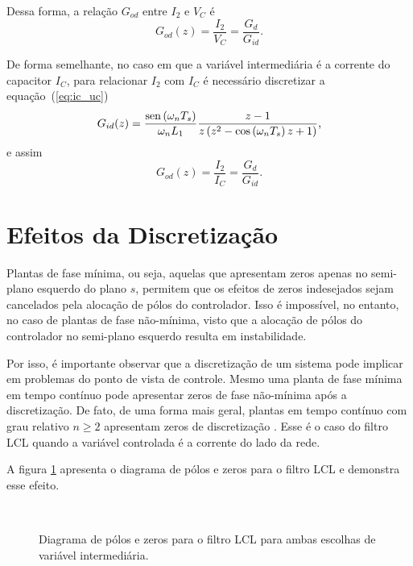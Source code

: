     Dessa forma, a relação $G_{od}$ entre $I_2$ e $V_C$ é
    \begin{equation}
        G_{od}(z) = \frac{I_2}{V_C} = \frac{G_d}{G_{id}} \text{.}
        \label{eq:god_i2_vc}
    \end{equation}

    De forma semelhante, no caso em que a variável intermediária é a corrente do capacitor $I_C$, para relacionar $I_2$ com $I_C$ é necessário discretizar a equação~(\ref{eq:ic_uc})
    \begin{equation}
        G_{id}(z) = \frac{\operatorname{sen} \left( \omega_n T_s \right)}{\omega_n L_1}
            \frac{z-1}{z \left( z^2 - \cos \left( \omega_n T_s \right) z + 1 \right)}
            \text{,}
    \end{equation}
    e assim
    \begin{equation}
        G_{od}(z) = \frac{I_2}{I_C} = \frac{G_d}{G_{id}} \text{.}
        \label{eq:god_i2_ic}
    \end{equation}


\section{Efeitos da Discretização}

    Plantas de fase mínima, ou seja, aquelas que apresentam zeros apenas no semi-plano esquerdo do plano $s$, permitem que os efeitos de zeros indesejados sejam cancelados pela alocação de pólos do controlador. Isso é impossível, no entanto, no caso de plantas de fase não-mínima, visto que a alocação de pólos do controlador no semi-plano esquerdo resulta em instabilidade.

    Por isso, é importante observar que a discretização de um sistema pode implicar em problemas do ponto de vista de controle. Mesmo uma planta de fase mínima em tempo contínuo pode apresentar zeros de fase não-mínima após a discretização. De fato, de uma forma mais geral, plantas em tempo contínuo com grau relativo $n \ge 2$ apresentam zeros de discretização \cite{ref:ASTROM}. Esse é o caso do filtro LCL quando a variável controlada é a corrente do lado da rede.


    A figura \ref{fig:pzmap_ic_vc} apresenta o diagrama de pólos e zeros para o filtro LCL e demonstra esse efeito.

    \begin{figure}[htb]
        \centering
        \\
        \renewcommand\figurename{Fig.}
        \caption{Diagrama de pólos e zeros para o filtro LCL para ambas escolhas de variável intermediária.}
        \label{fig:pzmap_ic_vc}
    \end{figure}


